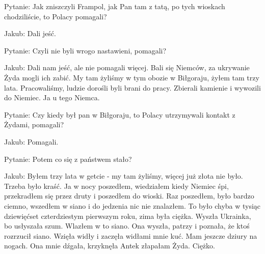 Pytanie: Jak zniszczyli Frampol, jak Pan tam z tatą, po tych wioskach chodziliście, to Polacy pomagali? 

Jakub: Dali jeść. 

Pytanie: Czyli nie byli wrogo nastawieni, pomagali? 

Jakub: Dali nam jeść, ale nie pomagali więcej. Bali się Niemców, za ukrywanie Żyda mogli ich zabić. My tam żyliśmy w tym obozie w Biłgoraju, żyłem tam trzy lata. Pracowaliśmy, ludzie dorośli byli brani do pracy. Zbierali kamienie i wywozili do Niemiec. Ja u tego Niemca. 

Pytanie: Czy kiedy był pan w Biłgoraju, to Polacy utrzymywali kontakt z Żydami, pomagali? 

Jakub: Pomagali. 

Pytanie: Potem co się z państwem stało? 

Jakub: Byłem trzy lata w getcie - my tam żyliśmy, więcej już złota nie było. Trzeba było kraść. Ja          w nocy poszedłem, wiedziałem kiedy Niemiec śpi, przekradłem się przez druty i poszedłem do wioski. Raz poszedłem, było bardzo ciemno, wszedłem w siano i do jedzenia nic nie znalazłem. To było chyba w tysiąc dziewięćset czterdziestym pierwszym roku, zima była ciężka. Wyszła Ukrainka, bo usłyszała szum. Wlazłem w to siano. Ona wyszła, patrzy i poznała, że ktoś rozrzucił siano. Wzięła widły i zaczęła widłami mnie kuć. Mam jeszcze dziury na nogach. Ona mnie dźgała, krzyknęła Antek złapałam Żyda. Ciężko.  

